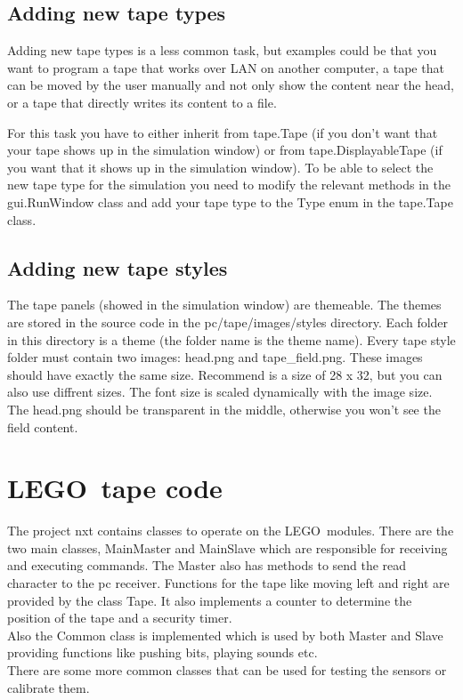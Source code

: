 \documentclass[%
  a4paper,%
  11pt,%
  blue,%
  hyperref	%
  ]{tubsartcl}
\begin{document}
\subsection{Adding new tape types}

Adding new tape types is a less common task, but examples could be that you want to program a tape that works over LAN on another computer, a tape that can be moved by the user manually and not only show the content near the head, or a tape that directly writes its content to a file.

For this task you have to either inherit from tape.Tape (if you don't want that your tape shows up in the simulation window) or from tape.DisplayableTape (if you want that it shows up in the simulation window). To be able to select the new tape type for the simulation you need to modify the relevant methods in the gui.RunWindow class and add your tape type to the Type enum in the tape.Tape class.

\subsection{Adding new tape styles}
\label{sec:adding-new-tape}

The tape panels (showed in the simulation window) are themeable. The themes are stored in the source code in the pc/tape/images/styles directory. Each folder in this directory is a theme (the folder name is the theme name). Every tape style folder must contain two images: head.png and tape\_field.png. These images should have exactly the same size. Recommend is a size of 28 x 32, but you can also use diffrent sizes. The font size is scaled dynamically with the image size. The head.png should be transparent in the middle, otherwise you won't see the field content.


\section{LEGO\textregistered\, tape code}
\label{sec:lego}

The project nxt contains classes to operate on the LEGO\textregistered\, modules. There are the two main classes, MainMaster and MainSlave which are responsible for receiving and executing commands. The Master also has methods to send the read character to the pc receiver. Functions for the tape like moving left and right are provided by the class Tape. It also implements a counter to determine the position of the tape and a security timer. \\
Also the Common class is implemented which is used by both Master and Slave providing functions like pushing bits, playing sounds etc.\\
There are some more common classes that can be used for testing the sensors or calibrate them.
\end{document}
